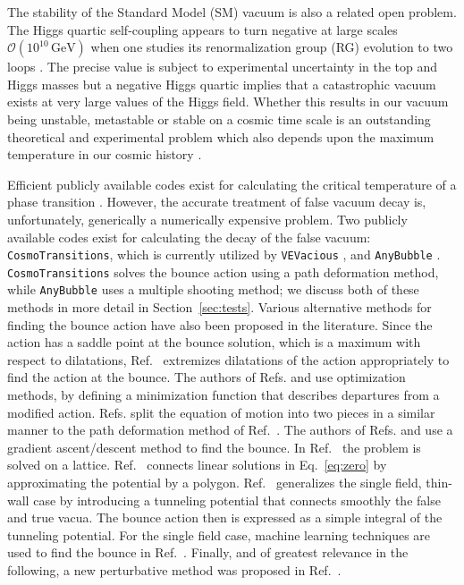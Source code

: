 \documentclass[final,3p,11pt,pdflatex]{elsarticle}
\makeatletter
\newcommand{\ab}{\texttt{AnyBubble}\@\xspace}
\newcommand{\cosmo}{\texttt{CosmoTransitions}\@\xspace}
\newcommand{\gev}{\ensuremath{\,\text{GeV}}}
\newcommand{\vevac}{\texttt{VEVacious}\@\xspace}
\newcommand{\secref}[1]{Section~\ref{#1}}
\renewcommand{\refeq}[1]{Eq.~\ref{#1}}
\newcommand{\refcite}[1]{Ref.~\cite{#1}}
\makeatother
\begin{document}
The stability of the Standard Model (SM) vacuum is also a related open problem.
The Higgs quartic self-coupling appears to turn negative at large scales
$\mathcal{O}(10^{10}\gev)$ when one studies its renormalization group (RG)
evolution to two loops \cite{Sher:1988mj,Camargo-Molina:2013sta,Blinov:2013fta,
  Swiezewska:2015paa,Bobrowski:2014dla,Hollik:2016dcm,MOLINA:2014uha}.  The
precise value is subject to experimental uncertainty in the top and Higgs masses
but a negative Higgs quartic implies that a catastrophic vacuum exists at very
large values of the Higgs field.  Whether this results in our vacuum being
unstable, metastable or stable on a cosmic time scale is an outstanding
theoretical and experimental problem \cite{Andreassen:2017rzq} which also
depends upon the maximum temperature in our cosmic history
\cite{Degrassi:2012ry,Rose:2015lna}.

Efficient publicly available codes exist for calculating the critical
temperature of a phase transition \cite{Basler:2018cwe}. However, the accurate
treatment of false vacuum decay is, unfortunately,
generically a numerically expensive problem.  Two publicly available
codes exist for calculating the decay of the false vacuum: \cosmo,
which is currently utilized by \vevac
\cite{Wainwright:2011kj,Camargo-Molina:2013qva}, and \ab
\cite{Masoumi:2016wot}.  \cosmo solves the bounce action using a path
deformation method, while \ab uses a multiple shooting method; we
discuss both of these methods in more detail in \secref{sec:tests}.
Various alternative methods for finding the bounce action have also been
proposed in the literature.  Since the action has a saddle point at
the bounce solution, which is a maximum with respect to dilatations,
\refcite{Claudson:1983et} extremizes dilatations of the action
appropriately to find the action at the bounce.  The authors of
Refs. \cite{Kusenko:1995jv, Kusenko:1996jn, Moreno:1998bq} and
\cite{John:1998ip} use optimization methods, by defining a
minimization function that describes departures from a modified
action.  Refs. \cite{Cline:1999wi, Dasgupta:1996qu} split the equation
of motion into two pieces in a similar manner to the path deformation
method of \refcite{Wainwright:2011kj}.  The authors of
Refs. \cite{Cline:1999wi} and \cite{Cline:1998rc} use a gradient
ascent/descent method to find the bounce.  In
\refcite{Konstandin:2006nd} the problem is solved on a lattice.
\refcite{Guada:2018jek} connects linear solutions in \refeq{eq:zero}
by approximating the potential by a polygon.
\refcite{Espinosa:2018hue} generalizes the single field, thin-wall
case by introducing a tunneling potential that connects smoothly the
false and true vacua.  The bounce action then is expressed as a simple
integral of the tunneling potential.  For the single field case,
machine learning techniques are used to find the bounce in
\refcite{Jinno:2018jov}.  Finally, and of greatest relevance in the following,
a new perturbative method was proposed in \refcite{Akula:2016gpl}.
\end{document}
